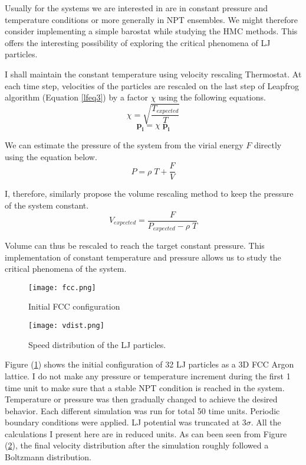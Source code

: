 \documentclass[aps,prl,reprint]{revtex4-1}
\begin{document}
Usually for the systems we are interested in are in constant pressure and temperature conditions or more generally in NPT ensembles. We might therefore consider implementing a simple barostat while studying the HMC methods. This offers the interesting possibility of exploring the critical phenomena of LJ particles.

I shall maintain the constant temperature using velocity rescaling Thermostat. At each time step, velocities of the particles are rescaled on the last step of Leapfrog algorithm (Equation \ref{lfeq3}) by a factor $\chi $ using the following equations.
\begin{equation}
\chi = \sqrt{\frac{T_{expected}}{T}}
\end{equation}
\begin{equation}
\mathbf{p_i} = \chi \; \mathbf{p_i}
\end{equation}

We can estimate the pressure of the system from the virial energy $F$ directly using the equation below.
\begin{equation}
P = \rho \; T + \frac{F}{V}
\end{equation}

I, therefore, similarly propose the volume rescaling method to keep the pressure of the system constant. 
\begin{equation}
	V_{expected} = \frac{F}{P_{expected} - \rho \; T}
\end{equation}

Volume can thus be rescaled to reach the target constant pressure. This implementation of constant temperature and pressure allows us to study the critical phenomena of the system.
\newline

\begin{figure}
	\texttt{[image: fcc.png]}
	\caption{Initial FCC configuration} \label{fcc}
\end{figure}

\begin{figure}
	\texttt{[image: vdist.png]}
	\caption{Speed distribution of the LJ particles.} \label{vdist}
\end{figure}

Figure (\ref{fcc}) shows the initial configuration of 32 LJ particles as a 3D FCC Argon lattice. I do not make any pressure or temperature increment during the first 1 time unit to make sure that a stable NPT condition is reached in the system. Temperature or pressure was then gradually changed to achieve the desired behavior. Each different simulation was run for total 50 time units. Periodic boundary conditions were applied. LJ potential was truncated at $3 \sigma $. All the calculations I present here are in reduced units. As can been seen from Figure (\ref{vdist}), the final velocity distribution after the simulation roughly followed a Boltzmann distribution.
\end{document}

